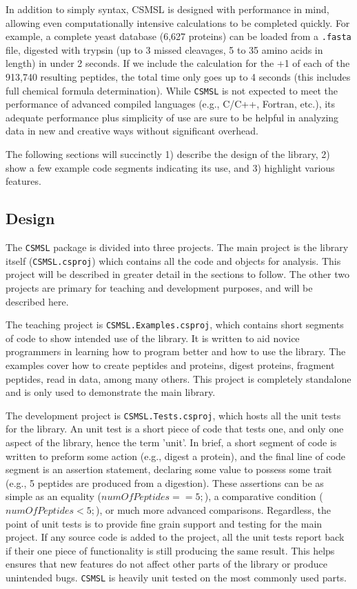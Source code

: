 In addition to simply syntax, CSMSL is designed with performance in mind, allowing even computationally intensive calculations to be completed quickly. For example, a complete yeast database (6,627 proteins) can be loaded from a \texttt{.fasta} file, digested with trypsin (up to 3 missed cleavages, 5 to 35 amino acids in length) in under 2 seconds. If we include the calculation for the +1 \mz{} of each of the 913,740 resulting peptides, the total time only goes up to 4 seconds (this includes full chemical formula determination). While \texttt{CSMSL} is not expected to meet the performance of advanced compiled languages (e.g., C/C++, Fortran, etc.), its adequate performance plus simplicity of use are sure to be helpful in analyzing data in new and creative ways without significant overhead.

The following sections will succinctly 1) describe the design of the library, 2) show a few example code segments indicating its use, and 3) highlight various features.

\subsection*{Design}
The \texttt{CSMSL} package is divided into three projects. The main project is the library itself (\texttt{CSMSL.csproj}) which contains all the code and objects for analysis. This project will be described in greater detail in the sections to follow. The other two projects are primary for teaching and development purposes, and will be described here. 

The teaching project is \texttt{CSMSL.Examples.csproj}, which contains short segments of code to show intended use of the library. It is written to aid novice programmers in learning how to program better and how to use the library. The examples cover how to create peptides and proteins, digest proteins, fragment peptides, read in data, among many others. This project is completely standalone and is only used to demonstrate the main library. 

The development project is \texttt{CSMSL.Tests.csproj}, which hosts all the unit tests for the library. An unit test is a short piece of code that tests one, and only one aspect of the library, hence the term 'unit'. In brief, a short segment of code is written to preform some action (e.g., digest a protein), and the final line of code segment is an assertion statement, declaring some value to possess some trait (e.g., 5 peptides are produced from a digestion). These assertions can be as simple as an equality ($numOfPeptides == 5;$), a comparative condition ($numOfPeptides < 5;$), or much more advanced comparisons. Regardless, the point of unit tests is to provide fine grain support and testing for the main project. If any source code is added to the project, all the unit tests report back if their one piece of functionality is still producing the same result. This helps ensures that new features do not affect other parts of the library or produce unintended bugs. \texttt{CSMSL} is heavily unit tested on the most commonly used parts.

